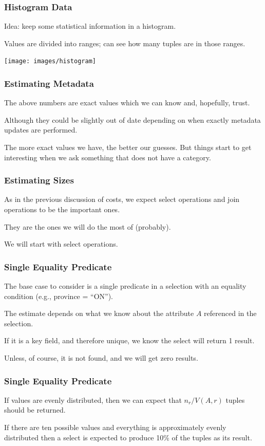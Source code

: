 \begin{frame}
\frametitle{Histogram Data}

Idea: keep some statistical information in a histogram. 

Values are divided into ranges; can see how many tuples are in those ranges. 

\begin{center}
\texttt{[image: images/histogram]}
\end{center}

\end{frame}

\begin{frame}
\frametitle{Estimating Metadata}

The above numbers are exact values which we can know and, hopefully, trust. 

Although they could be slightly out of date depending on when exactly metadata updates are performed. 

The more exact values we have, the better our guesses. But things start to get interesting when we ask something that does not have a category.


\end{frame}

\begin{frame}
\frametitle{Estimating Sizes}

As in the previous discussion of costs, we expect select operations and join operations to be the important ones.

They are the ones we will do the most of (probably).

We will start with select operations.

\end{frame}

\begin{frame}
\frametitle{Single Equality Predicate}

The base case to consider is a single predicate in a selection with an equality condition (e.g., province = ``ON''). 

The estimate depends on what we know about the attribute $A$ referenced in the selection. 

If it is a key field, and therefore unique, we know the select will return 1 result. 

Unless, of course, it is not found, and we will get zero results.

\end{frame}

\begin{frame}
\frametitle{Single Equality Predicate}

If values are evenly distributed, then we can expect that $n_{r}/V(A, r)$ tuples should be returned. 

If there are ten possible values and everything is approximately evenly distributed then a select is expected to produce 10\% of the tuples as its result. 

\end{frame}


